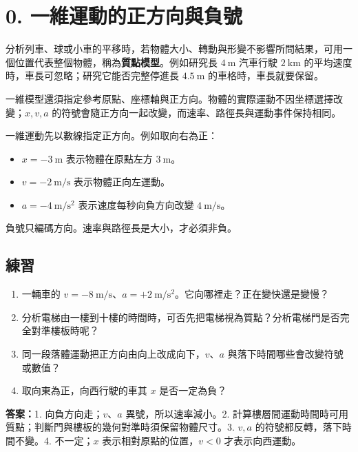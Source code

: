 \documentclass[11pt,a4paper]{article}
\providecommand{\tightlist}{%
  \setlength{\itemsep}{0pt}\setlength{\parskip}{0pt}}
\begin{document}
\section{0. 一維運動的正方向與負號}\label{ux4e00ux7dadux904bux52d5ux7684ux6b63ux65b9ux5411ux8207ux8ca0ux865f}

分析列車、球或小車的平移時，若物體大小、轉動與形變不影響所問結果，可用一個位置代表整個物體，稱為\textbf{質點模型}。例如研究長 \(4\ \mathrm m\) 汽車行駛 \(2\ \mathrm{km}\) 的平均速度時，車長可忽略；研究它能否完整停進長 \(4.5\ \mathrm m\) 的車格時，車長就要保留。

一維模型還須指定參考原點、座標軸與正方向。物體的實際運動不因坐標選擇改變；\(x,v,a\) 的符號會隨正方向一起改變，而速率、路徑長與運動事件保持相同。

一維運動先以數線指定正方向。例如取向右為正：

\begin{itemize}
\tightlist
\item
  \(x=-3\ \mathrm{m}\) 表示物體在原點左方 \(3\ \mathrm{m}\)。
\item
  \(v=-2\ \mathrm{m/s}\) 表示物體正向左運動。
\item
  \(a=-4\ \mathrm{m/s^2}\) 表示速度每秒向負方向改變 \(4\ \mathrm{m/s}\)。
\end{itemize}

負號只編碼方向。速率與路徑長是大小，才必須非負。

\begin{HandoutSelfCheck}

\subsection{練習}\label{ux7df4ux7fd2}

\begin{enumerate}
\def\labelenumi{\arabic{enumi}.}
\tightlist
\item
  一輛車的 \(v=-8\ \mathrm{m/s}\)、\(a=+2\ \mathrm{m/s^2}\)。它向哪裡走？正在變快還是變慢？
\item
  分析電梯由一樓到十樓的時間時，可否先把電梯視為質點？分析電梯門是否完全對準樓板時呢？
\item
  同一段落體運動把正方向由向上改成向下，\(v\)、\(a\) 與落下時間哪些會改變符號或數值？
\item
  取向東為正，向西行駛的車其 \(x\) 是否一定為負？
\end{enumerate}

\textbf{答案：}1. 向負方向走；\(v\)、\(a\) 異號，所以速率減小。2. 計算樓層間運動時間時可用質點；判斷門與樓板的幾何對準時須保留物體尺寸。3. \(v,a\) 的符號都反轉，落下時間不變。4. 不一定；\(x\) 表示相對原點的位置，\(v<0\) 才表示向西運動。

\end{HandoutSelfCheck}
\end{document}
